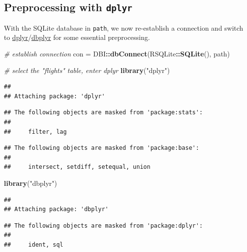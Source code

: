 \documentclass[]{scrbook}
\newenvironment{Shaded}{\begin{snugshade}}{\end{snugshade}}
\newcommand{\CommentTok}[1]{\textcolor[rgb]{0.56,0.35,0.01}{\textit{#1}}}
\newcommand{\KeywordTok}[1]{\textcolor[rgb]{0.13,0.29,0.53}{\textbf{#1}}}
\newcommand{\NormalTok}[1]{#1}
\newcommand{\OperatorTok}[1]{\textcolor[rgb]{0.81,0.36,0.00}{\textbf{#1}}}
\newcommand{\StringTok}[1]{\textcolor[rgb]{0.31,0.60,0.02}{#1}}
\renewenvironment{Shaded} {\begin{snugshade}\small} {\end{snugshade}}
\begin{document}
\hypertarget{preprocessing-with-dplyr}{%
\subsection{\texorpdfstring{Preprocessing with \texttt{dplyr}}{Preprocessing with dplyr}}\label{preprocessing-with-dplyr}}

With the SQLite database in \texttt{path}, we now re-establish a connection and switch to \href{https://cran.r-project.org/package=dplyr}{dplyr}/\href{https://cran.r-project.org/package=dbplyr}{dbplyr} for some essential preprocessing.

\begin{Shaded}
\begin{Highlighting}[]
\CommentTok{# establish connection}
\NormalTok{con =}\StringTok{ }\NormalTok{DBI}\OperatorTok{::}\KeywordTok{dbConnect}\NormalTok{(RSQLite}\OperatorTok{::}\KeywordTok{SQLite}\NormalTok{(), path)}

\CommentTok{# select the "flights" table, enter dplyr}
\KeywordTok{library}\NormalTok{(}\StringTok{"dplyr"}\NormalTok{)}
\end{Highlighting}
\end{Shaded}

\begin{verbatim}
## 
## Attaching package: 'dplyr'
\end{verbatim}

\begin{verbatim}
## The following objects are masked from 'package:stats':
## 
##     filter, lag
\end{verbatim}

\begin{verbatim}
## The following objects are masked from 'package:base':
## 
##     intersect, setdiff, setequal, union
\end{verbatim}

\begin{Shaded}
\begin{Highlighting}[]
\KeywordTok{library}\NormalTok{(}\StringTok{"dbplyr"}\NormalTok{)}
\end{Highlighting}
\end{Shaded}

\begin{verbatim}
## 
## Attaching package: 'dbplyr'
\end{verbatim}

\begin{verbatim}
## The following objects are masked from 'package:dplyr':
## 
##     ident, sql
\end{verbatim}
\end{document}
